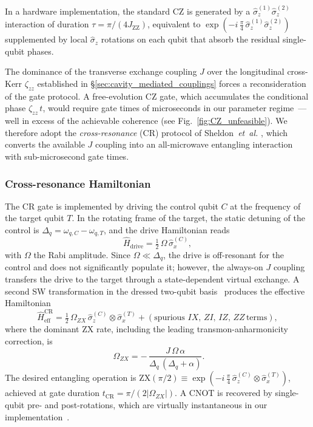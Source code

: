 In a hardware implementation, the standard CZ is generated by a
$\hat{\sigma}_z^{(1)}\hat{\sigma}_z^{(2)}$ interaction of duration
$\tau = \pi/(4 J_{\text{ZZ}})$, equivalent to
$\exp\!\left(-i\,\tfrac{\pi}{4}\,\hat{\sigma}_z^{(1)}\hat{\sigma}_z^{(2)}\right)$
supplemented by local $\hat{\sigma}_z$ rotations on each qubit that absorb
the residual single-qubit phases.

The dominance of the transverse exchange coupling $J$ over the longitudinal
cross-Kerr $\zeta_{zz}$ established in
\S\ref{sec:cavity_mediated_couplings} forces a reconsideration of the gate
protocol. A free-evolution CZ gate, which accumulates the conditional phase
$\zeta_{zz}\,t$, would require gate times of microseconds in our parameter
regime~--- well in excess of the achievable coherence
(see Fig.~\ref{fig:CZ_unfeasible}). We therefore adopt the
\emph{cross-resonance} (CR) protocol of Sheldon~\textit{et~al.}
\cite{Sheldon2016}, which converts the available $J$ coupling into an
all-microwave entangling interaction with sub-microsecond gate times.

\subsubsection{Cross-resonance Hamiltonian}
\label{subsec:CR_hamiltonian}

The CR gate is implemented by driving the control qubit $C$ at the frequency
of the target qubit $T$. In the rotating frame of the target, the static
detuning of the control is $\Delta_q = \omega_{q,C} - \omega_{q,T}$, and the
drive Hamiltonian reads
\begin{equation}
\hat{H}_{\text{drive}} = \tfrac{1}{2}\,\Omega\,\hat{\sigma}_x^{(C)},
\end{equation}
with $\Omega$ the Rabi amplitude. Since $\Omega \ll \Delta_q$, the drive is
off-resonant for the control and does not significantly populate it; however,
the always-on $J$ coupling transfers the drive to the target through a
state-dependent virtual exchange. A second SW transformation in the dressed
two-qubit basis~\cite{Sheldon2016, blais2021circuit} produces the effective
Hamiltonian
\begin{equation}
\hat{H}_{\text{eff}}^{\text{CR}} = \tfrac{1}{2}\,\Omega_{ZX}\,
\hat{\sigma}_z^{(C)}\!\otimes\hat{\sigma}_x^{(T)}
+ (\text{spurious } IX,\, ZI,\, IZ,\, ZZ\, \text{terms}),
\end{equation}
where the dominant ZX rate, including the leading transmon-anharmonicity
correction, is~\cite{Sheldon2016}
\begin{equation}
\boxed{\;
\Omega_{ZX} = -\,\frac{J\,\Omega\,\alpha}{\Delta_q\,(\Delta_q + \alpha)}.
}
\label{eq:omega_ZX}
\end{equation}
The desired entangling operation is
$\mathrm{ZX}(\pi/2) \equiv \exp\!\left(-i\,\tfrac{\pi}{4}\,
\hat{\sigma}_z^{(C)}\!\otimes\hat{\sigma}_x^{(T)}\right)$, achieved at gate
duration $t_{\mathrm{CR}} = \pi/(2|\Omega_{ZX}|)$. A CNOT is recovered by
single-qubit pre- and post-rotations, which are virtually instantaneous in our
implementation~\cite{krantz2019}.

